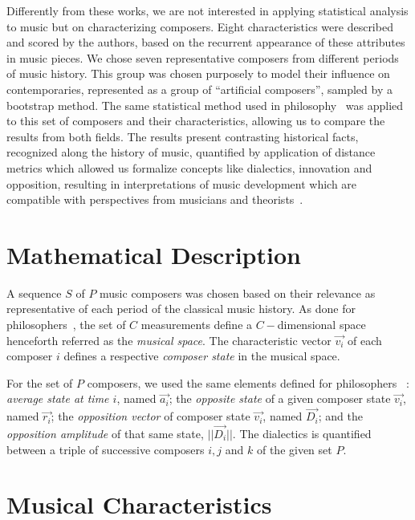 \documentclass[
 aip,
 jmp,
 amsmath,amssymb,
 reprint,
]{revtex4-1}
\begin{document}
Differently from these works, we are not interested in applying
statistical analysis to music but on characterizing composers.
Eight characteristics were described and scored by the authors, based
on the recurrent appearance of these attributes in music pieces.
We chose seven representative composers from different periods of
music history. 
This group was chosen purposely to model their
influence on contemporaries, represented as a group of
``artificial composers'', sampled by a bootstrap
method.
The same statistical method used in
philosophy~\cite{Fabbri} was applied to this set of composers and their
characteristics, allowing us to compare the results from both fields.
The
results present contrasting historical facts, recognized along
the history of music, quantified by application of
distance metrics which allowed us formalize
concepts like dialectics, innovation and opposition, resulting in
interpretations of music development which are
compatible with perspectives from musicians and
theorists~\cite{Webern, Lovelock}.

\section{Mathematical Description}

A sequence $S$ of $P$ music composers was chosen based on their
relevance as representative of each period of the classical music history.
As done for philosophers~\cite{Fabbri}, the set of $C$ measurements
define a $C-$dimensional space henceforth referred as the \emph{musical space}.  
The characteristic vector $\vec{v_i}$ of each composer $i$ defines a respective
\emph{composer state} in the musical space.  

For the set of
$P$ composers, we used the same elements defined for philosophers
~\cite{Fabbri}: \emph{average state at time $i$}, named $\vec{a_i}$;
the \emph{opposite state} of a given composer state $\vec{v_i}$, named $\vec{r_i}$;
the \emph{opposition vector} of composer state $\vec{v_i}$, named
$\vec{D_i}$; and the \emph{opposition
amplitude} of that same state, $|| \vec{D_i} ||$.
The dialectics is quantified between a triple of successive composers
 $i, j$ and $k$ of the given set $P$.


\section{Musical Characteristics}
\end{document}
